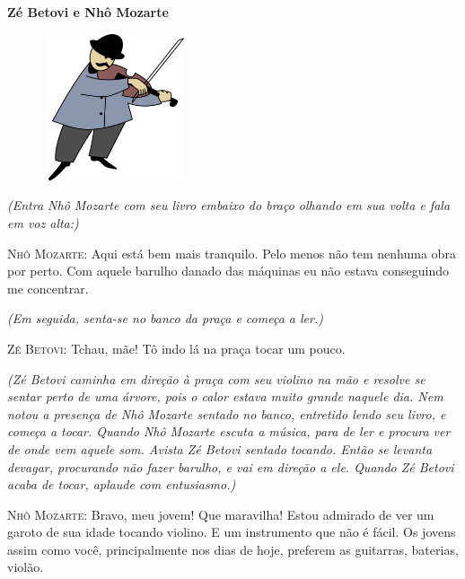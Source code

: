 
\begin{myquote}
\textbf{Zé Betovi e Nhô Mozarte}

\begin{figure}
\includegraphics[width=1.7in,height=1.7in]{./media/image2.png}
\end{figure}

\textit{(Entra Nhô Mozarte com seu livro embaixo do braço olhando em
sua volta e fala em voz alta:)}
\vspace{1ex}

\textsc{Nhô Mozarte}: Aqui está bem mais tranquilo. Pelo menos não tem
nenhuma obra por perto. Com aquele barulho danado das máquinas eu não
estava conseguindo me concentrar.

\vspace{1ex}
\textit{(Em seguida, senta-se no banco da praça e começa a ler.)}
\vspace{1ex}


\textsc{Zé Betovi}: Tchau, mãe! Tô indo lá na praça tocar um pouco.

\vspace{1ex}
\textit{(Zé Betovi caminha em
direção à praça com seu violino na mão e resolve se sentar perto de uma
árvore, pois o calor estava muito grande naquele dia. Nem notou a
presença de Nhô Mozarte sentado no banco, entretido lendo seu livro, e
começa a tocar. Quando Nhô Mozarte escuta a música, para de ler e
procura ver de onde vem aquele som. Avista Zé Betovi sentado tocando.
Então se levanta devagar, procurando não fazer barulho, e vai em direção
a ele. Quando Zé Betovi acaba de tocar, aplaude com entusiasmo.)}
\vspace{1ex}

\textsc{Nhô Mozarte}: Bravo, meu jovem! Que maravilha! Estou admirado de
ver um garoto de sua idade tocando violino. E um instrumento que não é
fácil. Os jovens assim como você, principalmente nos dias de hoje,
preferem as guitarras, baterias, violão.


\end{myquote}
